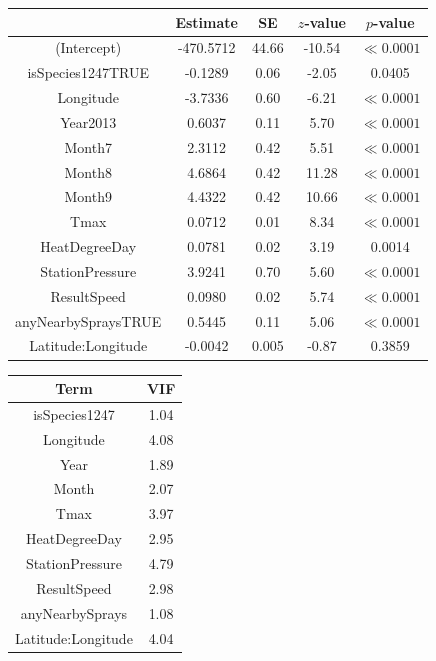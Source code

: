 \documentclass[12pt]{article}
\begin{document}
\begin{footnotesize}
\begin{tabular}{|c|cccc|} \hline
& Estimate & SE & $z$-value & $p$-value \\ \hline
(Intercept) & -470.5712 & 44.66 & -10.54 & $\ll 0.0001$ \\ 
isSpecies1247TRUE & -0.1289 & 0.06 & -2.05 & 0.0405 \\ 
Longitude & -3.7336 & 0.60 & -6.21 & $\ll 0.0001$ \\ 
Year2013 & 0.6037 & 0.11 & 5.70 & $\ll 0.0001$ \\ 
Month7 & 2.3112 & 0.42 & 5.51 & $\ll 0.0001$ \\ 
Month8 & 4.6864 & 0.42 & 11.28 & $\ll 0.0001$ \\ 
Month9 & 4.4322 & 0.42 & 10.66 & $\ll 0.0001$ \\ 
Tmax & 0.0712 & 0.01 & 8.34 & $\ll 0.0001$ \\ 
HeatDegreeDay & 0.0781 & 0.02 & 3.19 & 0.0014 \\ 
StationPressure & 3.9241 & 0.70 & 5.60 & $\ll 0.0001$ \\ 
ResultSpeed & 0.0980 & 0.02 & 5.74 & $\ll 0.0001$ \\ 
anyNearbySpraysTRUE & 0.5445 & 0.11 & 5.06 & $\ll 0.0001$ \\ 
Latitude:Longitude & -0.0042 & 0.005 & -0.87 & 0.3859 \\ \hline
\end{tabular} \qquad
\begin{tabular}{|cc|} \hline 
Term & VIF \\ \hline
isSpecies1247 & 1.04 \\ 
Longitude & 4.08 \\ 
Year & 1.89 \\ 
Month & 2.07 \\ 
Tmax & 3.97 \\ 
HeatDegreeDay & 2.95 \\ 
StationPressure & 4.79 \\ 
ResultSpeed & 2.98 \\ 
anyNearbySprays & 1.08 \\ 
Latitude:Longitude & 4.04 \\ \hline
\end{tabular}
\end{footnotesize}
\end{document}
